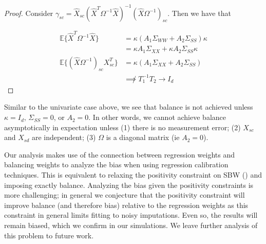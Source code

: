 \begin{proof}

    Consider $\gamma_{sc} = \hat{X}_{sc}(\hat{X}^T\Omega^{-1}\hat{X})^{-1}(\hat{X}\Omega^{-1})_{sc}$. Then we have that
    
    \begin{align*}
        \mathbb{E}\{\hat{X}^T\Omega^{-1}\hat{X}\} &= 
        \kappa(A_1\Sigma_{WW} + A_2\Sigma_{SS})\kappa \\
        &= \kappa A_1\Sigma_{XX} + \kappa A_2\Sigma_{SS} \kappa \\
        \mathbb{E}\{(\hat{X}\Omega^{-1})_{sc}X_{sc}^T\} &= \kappa(A_1\Sigma_{XX} + A_2\Sigma_{SS}) \\
        &\not\implies T_1^{-1}T_2 \to I_d
    \end{align*}
\end{proof}

\begin{remark}
Similar to the univariate case above, we see that balance is not achieved unless $\kappa = I_d$, $\Sigma_{SS} = 0$, or $A_2 = 0$. In other words, we cannot achieve balance asymptotically in expectation unless (1) there is no measurement error; (2) $X_{sc}$ and $X_{sd}$ are independent; (3) $\Omega$ is a diagonal matrix (ie $A_2 = 0$).
\end{remark}

Our analysis makes use of the connection between regression weights and balancing weights to analyze the bias when using regression calibration techniques. This is equivalent to relaxing the positivity constraint on SBW (\cite{chattopadhyay2021implied}) and imposing exactly balance. Analyzing the bias given the positivity constraints is more challenging; in general we conjecture that the positivity constraint will improve balance (and therefore bias) relative to the regression weights as this constraint in general limits fitting to noisy imputations. Even so, the results will remain biased, which we confirm in our simulations. We leave further analysis of this problem to future work.

